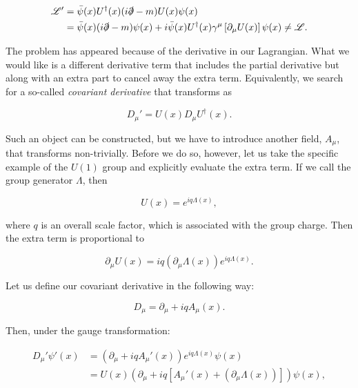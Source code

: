 \begin{equation}
\begin{split}
\mathscr{L}'& = \bar{\psi}(x)U^\dagger(x)(i \slashed{\partial} - m) U(x)\psi(x)\\
& = \bar{\psi}(x)(i \slashed{\partial} - m)\psi(x) + i \bar{\psi}(x) U^\dagger(x)\gamma^\mu\left[\partial_\mu U(x) \right]\psi(x) \neq \mathscr{L}.
\end{split}
\end{equation}

The problem has appeared because of the derivative in our Lagrangian. What we would like is a different derivative term that includes the partial derivative but along with an extra part to cancel away the extra term. Equivalently, we search for a so-called \emph{covariant derivative} that transforms as

\begin{equation}
D_\mu ' = U(x) D_\mu U^\dagger (x).
\end{equation}

Such an object can be constructed, but we have to introduce another field, $A_\mu$, that transforms non-trivially. Before we do so, however, let us take the specific example of the $U(1)$ group and explicitly evaluate the extra term. If we call the group generator $\Lambda$, then

\begin{equation}
U(x) = e^{i q \Lambda(x)},
\end{equation}

where $q$ is an overall scale factor, which is associated with the group charge. Then the extra term is proportional to

\begin{equation}
\partial_\mu U(x) = i q (\partial_\mu \Lambda(x)) e^{i q \Lambda(x)}.
\end{equation}

Let us define our covariant derivative in the following way:

\begin{equation}
\label{eqn:covder}
D_\mu = \partial_\mu + i q A_\mu(x).
\end{equation}

Then, under the gauge transformation:

\begin{equation}
\begin{split}
D_\mu' \psi'(x) & = (\partial_\mu + i q A_\mu'(x)) e^{i q \Lambda(x)} \psi(x) \\
& = U(x)(\partial_\mu + iq[A_\mu'(x) + (\partial_\mu \Lambda(x))])\psi(x),
\end{split}
\end{equation}

